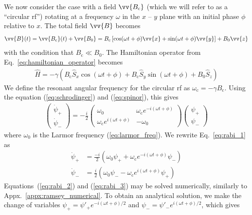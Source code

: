 We now consider the case with a field $\vv{B_\text{c}}$ (which we will refer to as a ``circular \acrshort{rf}'') rotating at a frequency $\omega$ in the $x$ -- $y$ plane with an initial phase $\phi$ relative to $x$. The total field $\vv{B}$ becomes
%
\begin{gather}
    \vv{B}(t)=\vv{B_\text{c}}(t) + \vv{B_0}=B_\text{c}\left[ \cos (\omega t + \phi) \vv{x} + \sin (\omega t + \phi) \vv{y}\right] + B_0 \vv{z}
\end{gather}
%
with the condition that $B_\text{c} \ll B_0$. The Hamiltonian operator from Eq.~\ref{eq:hamiltonian_operator} becomes
%
\begin{gather}
    \hat{H} = -\gamma \left( B_\text{c} \hat{S}_x \cos (\omega t + \phi) + B_\text{c} \hat{S}_y  \sin (\omega t + \phi) + B_0\hat{S}_z \right)\label{eq:rabi_hamiltonian}
\end{gather}
%
We define the resonant angular frequency for the circular \acrshort*{rf} as $\omega_\text{c}=-\gamma B_\text{c}$. Using the \schrodinger equation (\ref{eq:schrodinger}) and (\ref{eq:spinor}), this gives
%
\begin{gather}
    \left(\begin{matrix}
        \dot{\psi}_+\\
        \dot{\psi}_-
    \end{matrix}\right)
    = -\frac{i}{2}
    \left(\begin{matrix}
        \omega_0 & \omega_\text{c}e^{-i(\omega t + \phi)}\\
        \omega_\text{c}e^{i(\omega t + \phi)} & -\omega_0
    \end{matrix} \right)
    \left(\begin{matrix}
        \psi_+\\
        \psi_-
    \end{matrix}\right)\label{eq:rabi_1}
\end{gather}
%
where $\omega_0$ is the Larmor frequency (\ref{eq:larmor_freq}). We rewrite Eq.~\ref{eq:rabi_1} as
%
\begin{align}
    \dot{\psi}_+ &=\frac{-i}{2}\left( \omega_0 \psi_+ + \omega_\text{c} e^{-i(\omega t + \phi)} \psi_- \right)\label{eq:rabi_2}\\
    \dot{\psi}_- &=\frac{i}{2}\left( \omega_0 \psi_- - \omega_\text{c} e^{i(\omega t + \phi)} \psi_+ \right)\label{eq:rabi_3}
\end{align}
%
Equations~(\ref{eq:rabi_2}) and (\ref{eq:rabi_3}) may be solved numerically, similarly to Appx.~\ref{appx:ramsey_numerical}. To obtain an analytical solution, we make the change of variables $\psi_+ = \psi'_+ e^{-i(\omega t + \phi)/2}$ and $\psi_- = \psi'_- e^{i(\omega t + \phi)/2}$, which gives

